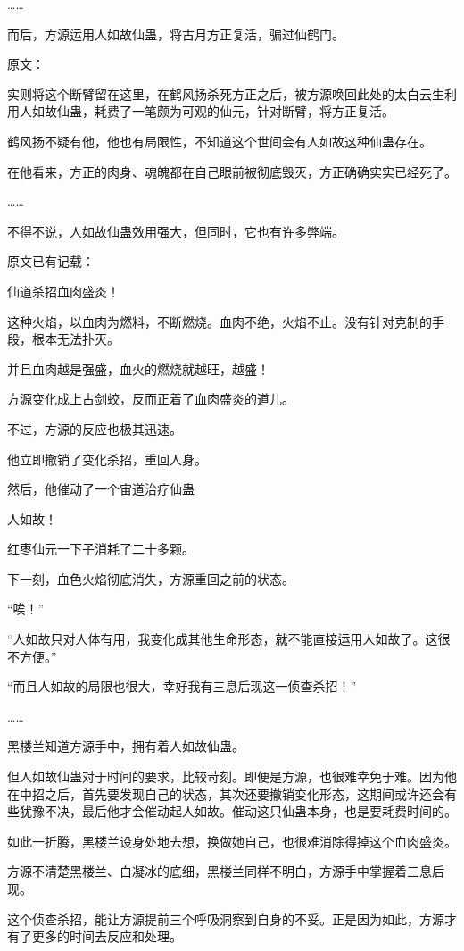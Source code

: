 \begin{this_body}
……

而后，方源运用人如故仙蛊，将古月方正复活，骗过仙鹤门。

原文：

实则将这个断臂留在这里，在鹤风扬杀死方正之后，被方源唤回此处的太白云生利用人如故仙蛊，耗费了一笔颇为可观的仙元，针对断臂，将方正复活。

鹤风扬不疑有他，他也有局限性，不知道这个世间会有人如故这种仙蛊存在。

在他看来，方正的肉身、魂魄都在自己眼前被彻底毁灭，方正确确实实已经死了。

……

不得不说，人如故仙蛊效用强大，但同时，它也有许多弊端。

原文已有记载：

仙道杀招血肉盛炎！

这种火焰，以血肉为燃料，不断燃烧。血肉不绝，火焰不止。没有针对克制的手段，根本无法扑灭。

并且血肉越是强盛，血火的燃烧就越旺，越盛！

方源变化成上古剑蛟，反而正着了血肉盛炎的道儿。

不过，方源的反应也极其迅速。

他立即撤销了变化杀招，重回人身。

然后，他催动了一个宙道治疗仙蛊

人如故！

红枣仙元一下子消耗了二十多颗。

下一刻，血色火焰彻底消失，方源重回之前的状态。

“唉！”

“人如故只对人体有用，我变化成其他生命形态，就不能直接运用人如故了。这很不方便。”

“而且人如故的局限也很大，幸好我有三息后现这一侦查杀招！”

……

黑楼兰知道方源手中，拥有着人如故仙蛊。

但人如故仙蛊对于时间的要求，比较苛刻。即便是方源，也很难幸免于难。因为他在中招之后，首先要发现自己的状态，其次还要撤销变化形态，这期间或许还会有些犹豫不决，最后他才会催动起人如故。催动这只仙蛊本身，也是要耗费时间的。

如此一折腾，黑楼兰设身处地去想，换做她自己，也很难消除得掉这个血肉盛炎。

方源不清楚黑楼兰、白凝冰的底细，黑楼兰同样不明白，方源手中掌握着三息后现。

这个侦查杀招，能让方源提前三个呼吸洞察到自身的不妥。正是因为如此，方源才有了更多的时间去反应和处理。


\end{this_body}
